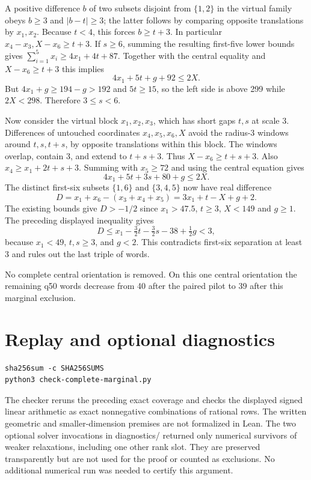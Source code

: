 \documentclass[10pt,letterpaper]{article}
\begin{document}
A positive difference \(b\) of two subsets disjoint from \(\{1,2\}\) in
the virtual family obeys \(b\ge3\) and \(|b-t|\ge3\); the latter follows
by comparing opposite translations by \(x_1,x_2\). Because \(t<4\), this
forces \(b\ge t+3\). In particular \(x_4-x_3,X-x_6\ge t+3\). If
\(s\ge6\), summing the resulting first-five lower bounds gives
\(\sum_{i=1}^5x_i\ge4x_1+4t+87\). Together with the central equality and
\(X-x_6\ge t+3\) this implies \[
 4x_1+5t+g+92\le2X.
\] But \(4x_1+g\ge194-g>192\) and \(5t\ge15\), so the left side is above
299 while \(2X<298\). Therefore \(3\le s<6\).

Now consider the virtual block \(x_1,x_2,x_3\), which has short gaps
\(t,s\) at scale 3. Differences of untouched coordinates
\(x_4,x_5,x_6,X\) avoid the radius-3 windows around \(t,s,t+s\), by
opposite translations within this block. The windows overlap, contain 3,
and extend to \(t+s+3\). Thus \(X-x_6\ge t+s+3\). Also
\(x_4\ge x_1+2t+s+3\). Summing with \(x_5\ge72\) and using the central
equation gives \[
 4x_1+5t+3s+80+g\le2X.
\] The distinct first-six subsets \(\{1,6\}\) and \(\{3,4,5\}\) now have
real difference \[
 D=x_1+x_6-(x_3+x_4+x_5)=3x_1+t-X+g+2.
\] The existing bounds give \(D>-1/2\) since \(x_1>47.5\), \(t\ge3\),
\(X<149\) and \(g\ge1\). The preceding displayed inequality gives \[
D\le x_1-\tfrac32 t-\tfrac32 s-38+\tfrac12 g<3,
\] because \(x_1<49\), \(t,s\ge3\), and \(g<2\). This contradicts
first-six separation at least 3 and rules out the last triple of words.

No complete central orientation is removed. On this one central
orientation the remaining q50 words decrease from 40 after the paired
pilot to 39 after this marginal exclusion.

\section{Replay and optional
diagnostics}\label{replay-and-optional-diagnostics}

\begin{verbatim}
sha256sum -c SHA256SUMS
python3 check-complete-marginal.py
\end{verbatim}

The checker reruns the preceding exact coverage and checks the displayed
signed linear arithmetic as exact nonnegative combinations of rational
rows. The written geometric and smaller-dimension premises are not
formalized in Lean. The two optional solver invocations in diagnostics/
returned only numerical survivors of weaker relaxations, including one
other rank slot. They are preserved transparently but are not used for
the proof or counted as exclusions. No additional numerical run was
needed to certify this argument.
\end{document}

